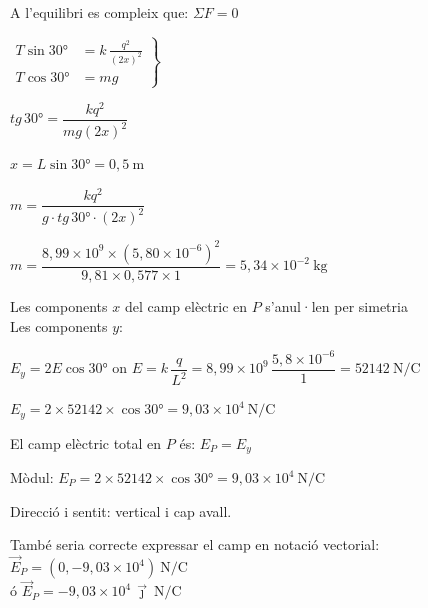 \begin{solapartat}
 A l'equilibri es compleix que: $\Sigma F = 0$


 $\left.\begin{aligned} T\sin 30° &= k\,\frac{q^2}{(2x)^2}\\ T\cos 30° &= mg\end{aligned}\right\}$

 $\mathit{tg}\,30° = \dfrac{kq^2}{mg(2x)^2}$

 $x = L\sin 30° = 0,5\ \mathrm{m}$

 $m = \dfrac{kq^2}{g\cdot\mathit{tg}\,30°\cdot(2x)^2}$

 $m = \dfrac{8,99\times 10^{9}\times(5,80\times 10^{-6})^2}{9,81\times 0,577\times 1} = 5,34\times 10^{-2}\ \mathrm{kg}$
\end{solapartat}

\begin{solapartat}
Les components $x$ del camp elèctric en $P$ s'anul·len per simetria \\
Les components $y$:

$E_y = 2E\cos 30°$  on $E = k\,\dfrac{q}{L^2} = 8,99\times 10^{9}\,\dfrac{5,8\times 10^{-6}}{1} = 52142\ \mathrm{N/C}$ 

$E_y = 2\times 52142\times\cos 30° = 9,03\times 10^{4}\ \mathrm{N/C}$ 

 El camp elèctric total en $P$ és: $E_P = E_y$

 Mòdul: $E_P = 2\times 52142\times\cos 30° = 9,03\times 10^{4}\ \mathrm{N/C}$

 Direcció i sentit: vertical i cap avall.

També seria correcte expressar el camp en notació vectorial: $\vec{E}_P = (0, -9,03\times 10^{4})\ \mathrm{N/C}$\\
ó $\vec{E}_P = -9,03\times 10^{4}\,\vec{\jmath}\ \mathrm{N/C}$
\end{solapartat}

